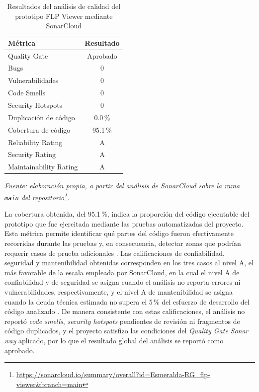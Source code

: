 \begin{table}[H]
\centering
\footnotesize
\caption{Resultados del análisis de calidad del prototipo FLP Viewer mediante SonarCloud}
\label{tab:sonarcloud-resultados}
\begin{tabular}{|l|c|}
\hline
\textbf{Métrica} & \textbf{Resultado} \\
\hline
Quality Gate & Aprobado \\
\hline
Bugs & 0 \\
\hline
Vulnerabilidades & 0 \\
\hline
Code Smells & 0 \\
\hline
Security Hotspots & 0 \\
\hline
Duplicación de código & 0.0\,\% \\
\hline
Cobertura de código & 95.1\,\% \\
\hline
Reliability Rating & A \\
\hline
Security Rating & A \\
\hline
Maintainability Rating & A \\
\hline
\end{tabular}
\vskip 4pt
\footnotesize\textit{Fuente: elaboración propia, a partir del análisis de SonarCloud sobre la rama \texttt{main} del repositorio\footnote{\url{https://sonarcloud.io/summary/overall?id=Esmeralda-RG_flp-viewer&branch=main}}.}
\end{table}

La cobertura obtenida, del 95.1\,\%, indica la proporción del código ejecutable del prototipo que fue ejercitada mediante las pruebas automatizadas del proyecto. Esta métrica permite identificar qué partes del código fueron efectivamente recorridas durante las pruebas y, en consecuencia, detectar zonas que podrían requerir casos de prueba adicionales \cite{sonarcloud_coverage}. Las calificaciones de confiabilidad, seguridad y mantenibilidad obtenidas corresponden en los tres casos al nivel A, el más favorable de la escala empleada por SonarCloud, en la cual el nivel A de confiabilidad y de seguridad se asigna cuando el análisis no reporta errores ni vulnerabilidades, respectivamente, y el nivel A de mantenibilidad se asigna cuando la deuda técnica estimada no supera el 5\,\% del esfuerzo de desarrollo del código analizado \cite{sonarcloud_metrics}. De manera consistente con estas calificaciones, el análisis no reportó \textit{code smells}, \textit{security hotspots} pendientes de revisión ni fragmentos de código duplicados, y el proyecto satisfizo las condiciones del \textit{Quality Gate} \textit{Sonar way} aplicado, por lo que el resultado global del análisis se reportó como aprobado.

